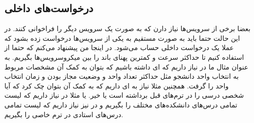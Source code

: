 \subsection{درخواست‌های داخلی}
بعضا برخی از سرویس‌ها نیاز دارن که به صورت
یک سرویس دیگر را فراخوانی کنند. در این حالت حتما باید به صورت مستقیم به یکی از سرویس‌ها درخواست
زده بشود که عملا یک درخواست داخلی حساب می‌شود. در اینجا من پیشنهاد می‌کنم که حتما از
استفاده کنیم تا حداکثر سرعت و کمترین پهنای باند را بین میکروسرویس‌ها بگیریم.
به عنوان مثال ما در
نیاز داریم که
ای
داشته باشیم که بتوان به کمک آن مشخصات مربوط به انتخاب واحد دانشجو مثل حداکثر تعداد واحد و
وضعیت مجاز بودن و زمان انتخاب واحد را گرفت. همچنین مثلا نیاز به
ای
داریم که به کمک آن بتوان چک کرد که آیا شخصی درسی را در ترم‌های قبل برداشته است یا خیر.
یا مثلا در
نیاز داریم که لیست تمامی درس‌های دانشکده‌های مختلف را بگیریم و در
نیز نیاز داریم که لیست تمامی درس‌های استادی در ترم خاصی را بگیریم.